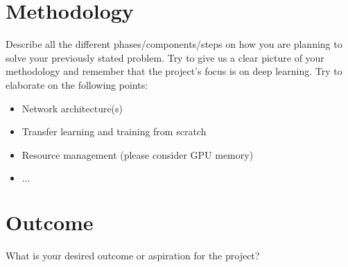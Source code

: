 \documentclass[10pt,twocolumn,letterpaper]{article}
\begin{document}
\section{Methodology}
    Describe all the different phases/components/steps on how you are planning to solve your previously stated problem. Try to give us a clear picture of your methodology and remember that the project's focus is on deep learning. Try to elaborate on the following points:
    \begin{itemize}
        \item Network architecture(s)
        \item Transfer learning and training from scratch
        \item Resource management (please consider GPU memory)
        \item $\dots$
    \end{itemize}

\section{Outcome}
    What is your desired outcome or aspiration for the project?

{\small


}
\end{document}
